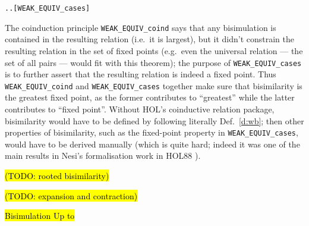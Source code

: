 \begin{enumerate}
\begin{small}
\begin{alltt}
       \HOLSymConst{\HOLTokenForall{}}.  \HOLTokenTransBegin\HOLSymConst{\ensuremath{\tau}}\HOLTokenTransEnd {} \HOLSymConst{\HOLTokenImp{}} \HOLSymConst{\HOLTokenExists{}}.  \HOLSymConst{\HOLTokenEPS}  \HOLSymConst{\HOLTokenConj{}}  \HOLSymConst{\HOLTokenWeakEQ} \hfill{[WEAK_EQUIV_cases]}
\end{alltt}
\end{small}
\end{enumerate}

The coinduction principle \texttt{WEAK_EQUIV_coind} says that any
bisimulation is contained in the resulting relation (i.e.~it is
largest), but it didn't constrain the resulting relation in the set of
fixed points (e.g.~even the universal relation --- the set of all
pairs --- would fit with this theorem); the
purpose of \texttt{WEAK_EQUIV_cases} is to
further assert that the resulting relation is indeed a
fixed point. Thus \texttt{WEAK_EQUIV_coind} and \texttt{WEAK_EQUIV_cases}
together make sure that bisimilarity is the greatest
fixed point, as
the former contributes to ``greatest'' while the latter
contributes to ``fixed point''.
%
Without HOL's coinductive relation package, bisimilarity
would have to be defined by following literally
Def.~\ref{d:wb};  then other properties of bisimilarity, such
as the fixed-point property in \texttt{WEAK_EQUIV_cases}, would have to be
derived manually (which is quite hard; indeed it was one of the main results
in Nesi's formalisation work  in HOL88 \cite{Nesi:1992ve}).


\hl{(TODO: rooted bisimilarity)}

\hl{(TODO: expansion and contraction)}

\hl{Bisimulation Up to}
